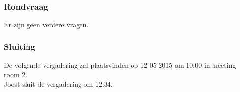 \subsubsection{Rondvraag}
Er zijn geen verdere vragen.

\subsubsection{Sluiting}
De volgende vergadering zal plaatsvinden op 12-05-2015 om 10:00 in meeting room 2.\\

Joost sluit de vergadering om 12:34.\\
